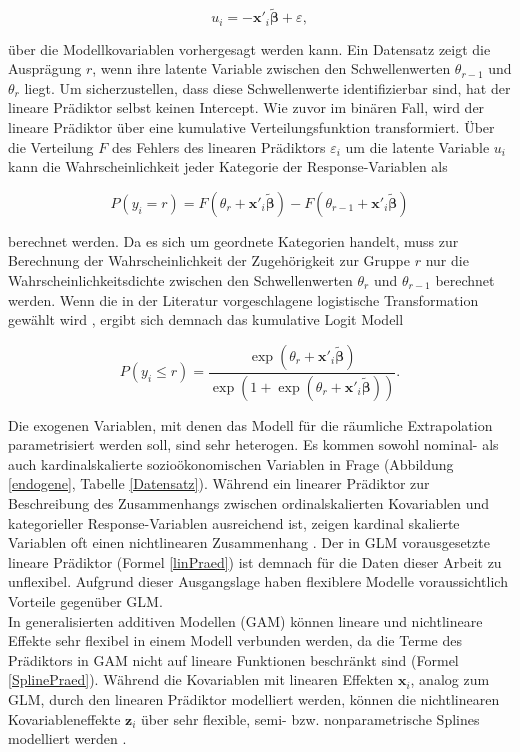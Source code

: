 \documentclass{Vorlage}
\begin{document}
\begin{equation}
u_i=-\mathbf{x}'_i \boldsymbol{\tilde{\beta}}+\varepsilon,
\end{equation}

über die Modellkovariablen vorhergesagt werden kann. Ein Datensatz zeigt die Ausprägung $r$, wenn ihre latente Variable zwischen den Schwellenwerten $\theta_{r-1}$ und $\theta_r$ liegt. Um sicherzustellen, dass diese Schwellenwerte identifizierbar sind, hat der lineare Prädiktor selbst keinen Intercept. Wie zuvor im binären Fall, wird der lineare Prädiktor über eine kumulative Verteilungsfunktion transformiert. Über die Verteilung $F$ des Fehlers des linearen Prädiktors  $\varepsilon_i$ um die latente Variable $u_i$ kann die Wahrscheinlichkeit jeder Kategorie der Response-Variablen als 

\begin{equation}
P(y_i=r)=F(\theta_r+\mathbf{x}'_i \boldsymbol{\tilde{\beta}})-F(\theta_{r-1}+\mathbf{x}'_i \boldsymbol{\tilde{\beta}})
\end{equation}

berechnet werden. Da es sich um geordnete Kategorien handelt, muss zur Berechnung der Wahrscheinlichkeit der Zugehörigkeit zur Gruppe $r$ nur die Wahrscheinlichkeitsdichte zwischen den Schwellenwerten $\theta_{r}$ und $\theta_{r-1}$ berechnet werden. Wenn die in der Literatur vorgeschlagene logistische Transformation gewählt wird \cite[p. 335]{fahrmeir2013regression}, ergibt sich demnach das kumulative Logit Modell

\begin{equation}
P(y_i\leq r)=\frac{\exp(\theta_r+\mathbf{x}'_i \boldsymbol{\tilde{\beta}})}{\exp(1+\exp(\theta_r+\mathbf{x}'_i \boldsymbol{\tilde{\beta}}))}.
\end{equation}

Die exogenen Variablen, mit denen das Modell für die räumliche Extrapolation parametrisiert werden soll, sind sehr heterogen. Es kommen sowohl nominal- als auch kardinalskalierte sozioökonomischen Variablen in Frage (Abbildung \ref{endogene}, Tabelle \ref{Datensatz}). Während ein linearer Prädiktor zur Beschreibung des Zusammenhangs zwischen ordinalskalierten Kovariablen und kategorieller Response-Variablen ausreichend ist, zeigen kardinal skalierte Variablen oft einen nichtlinearen Zusammenhang \cite[p. 9]{fahrmeir2009regression}. Der in GLM vorausgesetzte lineare Prädiktor (Formel \ref{linPraed}) ist demnach für die Daten dieser Arbeit zu unflexibel. Aufgrund dieser Ausgangslage haben flexiblere Modelle voraussichtlich Vorteile gegenüber GLM.\\
In generalisierten additiven Modellen (GAM) können lineare und nichtlineare Effekte sehr flexibel in einem Modell verbunden werden, da die Terme des Prädiktors in GAM nicht auf lineare Funktionen beschränkt sind (Formel \ref{SplinePraed}). Während die Kovariablen mit linearen Effekten $\mathbf{x}_i$, analog zum GLM, durch den linearen Prädiktor modelliert werden, können die nichtlinearen Kovariableneffekte $\mathbf{z}_i$ über sehr flexible, semi- bzw. nonparametrische Splines modelliert werden \cite[p. 1 f.]{wood2016}.
\end{document}
